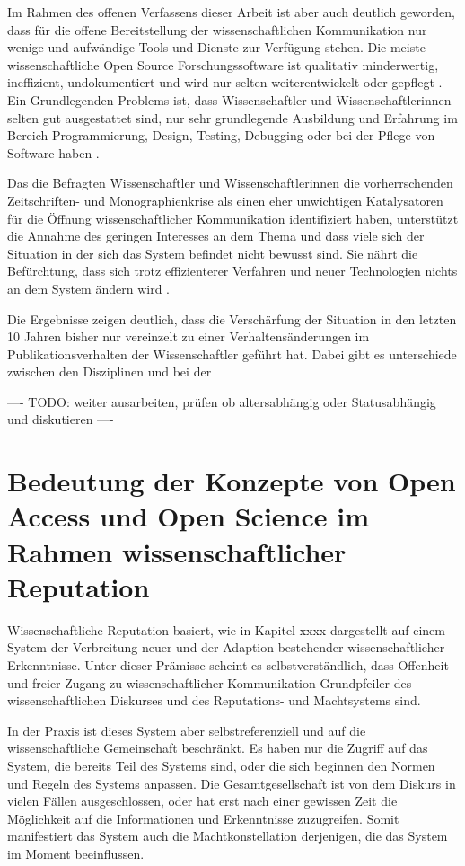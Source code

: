 Im Rahmen des offenen Verfassens dieser Arbeit ist aber auch deutlich geworden, dass für die offene Bereitstellung der wissenschaftlichen Kommunikation nur wenige und aufwändige Tools und Dienste zur Verfügung stehen. Die meiste wissenschaftliche Open Source Forschungssoftware ist qualitativ minderwertig, ineffizient, undokumentiert und wird nur selten weiterentwickelt oder gepflegt \cite{hey_2015_open}. Ein Grundlegenden Problems ist, dass Wissenschaftler und Wissenschaftlerinnen selten gut ausgestattet sind, nur sehr grundlegende Ausbildung und Erfahrung im Bereich Programmierung, Design, Testing, Debugging oder bei der Pflege von Software haben \cite{hey_2015_open}.

Das die Befragten Wissenschaftler und Wissenschaftlerinnen die vorherrschenden Zeitschriften- und Monographienkrise als einen eher unwichtigen Katalysatoren für die Öffnung wissenschaftlicher Kommunikation identifiziert haben, unterstützt die Annahme des geringen Interesses an dem Thema und dass viele sich der Situation in der sich das System befindet nicht bewusst sind. Sie nährt die Befürchtung, dass sich trotz effizienterer Verfahren und neuer Technologien nichts an dem System ändern wird \cite{Parks_2002_acadamic_faust}.

Die Ergebnisse zeigen deutlich, dass die Verschärfung der Situation in den letzten 10 Jahren bisher nur vereinzelt zu einer Verhaltensänderungen im Publikationsverhalten der Wissenschaftler geführt hat. Dabei gibt es unterschiede zwischen den Disziplinen und bei der

---- TODO: weiter ausarbeiten, prüfen ob altersabhängig oder Statusabhängig und diskutieren ----

\section{Bedeutung der Konzepte von Open Access und Open Science im Rahmen wissenschaftlicher Reputation}

Wissenschaftliche Reputation basiert, wie in Kapitel xxxx dargestellt auf einem System der Verbreitung neuer und der Adaption bestehender wissenschaftlicher Erkenntnisse. Unter dieser Prämisse scheint es selbstverständlich, dass Offenheit und freier Zugang zu wissenschaftlicher Kommunikation Grundpfeiler des wissenschaftlichen Diskurses und des Reputations- und Machtsystems sind.

In der Praxis ist dieses System aber selbstreferenziell und auf die wissenschaftliche Gemeinschaft beschränkt. Es haben nur die Zugriff auf das System, die bereits Teil des Systems sind, oder die sich beginnen den Normen und Regeln des Systems anpassen. Die Gesamtgesellschaft ist von dem Diskurs in vielen Fällen ausgeschlossen, oder hat erst nach einer gewissen Zeit die Möglichkeit auf die Informationen und Erkenntnisse zuzugreifen. Somit manifestiert das System auch die Machtkonstellation derjenigen, die das System im Moment beeinflussen.

